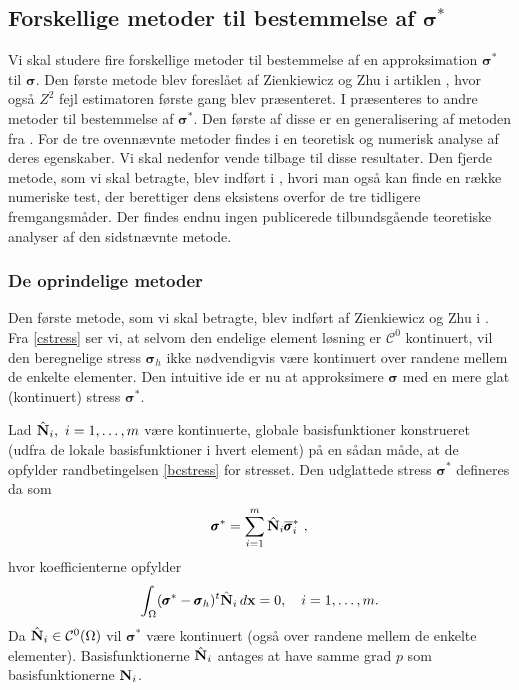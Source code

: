 \subsection{Forskellige metoder til bestemmelse af $\pmb{\sigma}^{\ast}$}
Vi skal studere fire forskellige metoder til bestemmelse af en
approksimation $\pmb{\sigma}^{\ast}$ til $\pmb{\sigma}$. Den første
metode blev foreslået af Zienkiewicz og Zhu i artiklen \cite{zz1},
hvor også $Z^2$ fejl estimatoren første gang blev præsenteret. I
\cite{zz2} præsenteres to andre metoder til bestemmelse af
$\pmb{\sigma}^{\ast}$. Den første af disse er en generalisering af
metoden fra \cite{zz1}. For de tre ovennævnte metoder findes i
\cite{zz2} en teoretisk og numerisk analyse af deres egenskaber. Vi
skal nedenfor vende tilbage til disse resultater. Den fjerde metode,
som vi skal betragte, blev indført i \cite{zz3}, hvori man også kan
finde en række numeriske test, der berettiger dens eksistens overfor
de tre tidligere fremgangsmåder. Der findes endnu ingen publicerede
tilbundsgående teoretiske analyser af den sidstnævnte metode.

\subsubsection{De oprindelige metoder}
Den første metode, som vi skal betragte, blev indført af Zienkiewicz
og Zhu i \cite{zz1}. Fra \eqref{cstress} ser vi, at selvom den
endelige element løsning er ${\mathcal C}^0$ kontinuert, vil den
beregnelige stress $\pmb{\sigma}_h$ ikke nødvendigvis være kontinuert
over randene mellem de enkelte elementer. Den intuitive ide er nu at
approksimere $\pmb\sigma$ med en mere glat (kontinuert) stress $\pmb{\sigma}^{\ast}$.

Lad $\hat{{\bf N}}_i, \ i=1,\ldots,m$ være kontinuerte, globale basisfunktioner konstrueret
(udfra de lokale basisfunktioner i hvert element) på en sådan måde, at
de opfylder randbetingelsen \eqref{bcstress} for stresset. Den
udglattede stress $\pmb{\sigma}^{\ast}$ defineres da som
\begin{equation}
  \pmb{\sigma}^{\ast} = \sum_{i=1}^m \hat{{\bf N}}_i
  \overline{\pmb{\sigma}}^{\ast}_i \ ,
\end{equation}
hvor koefficienterne opfylder
\begin{equation}
  \int_{\Omega} (\pmb{\sigma}^{\ast} - \pmb{\sigma}_h)^t
  \hat{{\bf N}}_i\, d{\bf x}=0, \quad i=1,\ldots,m .
\end{equation}
Da $\hat{{\bf N}}_i\in{\mathcal C}^0(\Omega )$ vil $\pmb{\sigma}^{\ast}$
være kontinuert (også over randene mellem de enkelte elementer).
Basisfunktionerne $\hat{{\bf N}}_i$ antages at have samme grad $p$
som basisfunktionerne ${\bf N}_i$.

